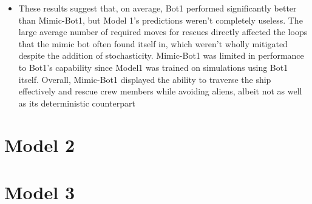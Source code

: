 \documentclass[11pt]{article}
\begin{document}
\begin{itemize}
\begin{itemize}
    \end{itemize}
    \item These results suggest that, on average, Bot1 performed significantly better than Mimic-Bot1, but Model 1's predictions weren't completely useless. The large average number of required moves for rescues directly affected the loops that the mimic bot often found itself in, which weren't wholly mitigated despite the addition of stochasticity. Mimic-Bot1 was limited in performance to Bot1's capability since Model1 was trained on simulations using Bot1 itself. Overall, Mimic-Bot1 displayed the ability to traverse the ship effectively and rescue crew members while avoiding aliens, albeit not as well as its deterministic counterpart
\end{itemize}

\section{Model 2}






\section{Model 3}





\end{document}
